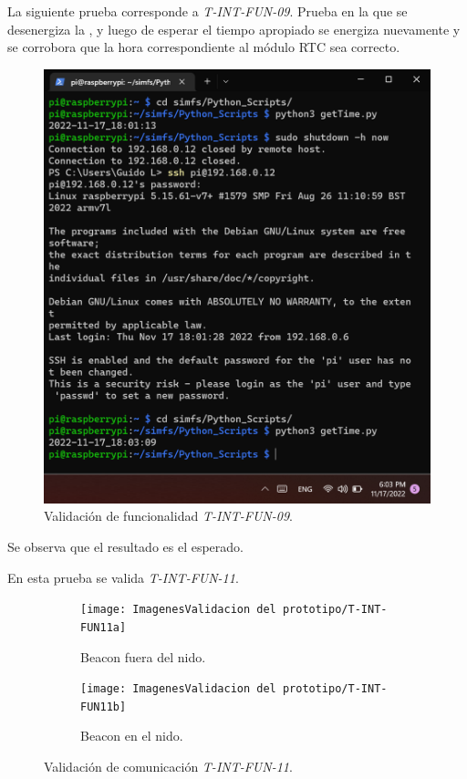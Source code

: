 La siguiente prueba corresponde a \textit{T-INT-FUN-09}. Prueba en la que se desenergiza la \rspi, y luego de esperar el tiempo apropiado se energiza nuevamente y se corrobora que la hora correspondiente al módulo RTC sea correcto.
\begin{figure}[H]
\centering
        	\includegraphics[width=1\linewidth]{ImagenesValidacion del prototipo/TINTFUN9}
	\caption{Validación de funcionalidad \textit{T-INT-FUN-09}.}
\end{figure}
Se observa que el resultado es el esperado.

En esta prueba se valida \textit{T-INT-FUN-11}.
\begin{figure}[H]
\centering
    	\begin{subfigure}{0.49\textwidth}
        	\centering
        	\texttt{[image: ImagenesValidacion del prototipo/T-INT-FUN11a]}		
			\caption{Beacon fuera del nido.}
        \end{subfigure}\hfill
        \begin{subfigure}{0.49\textwidth}
        	\centering
        	\texttt{[image: ImagenesValidacion del prototipo/T-INT-FUN11b]}
        	\caption{Beacon en el nido.}
        \end{subfigure}
	\caption{Validación de comunicación \textit{T-INT-FUN-11}.}
\end{figure}

